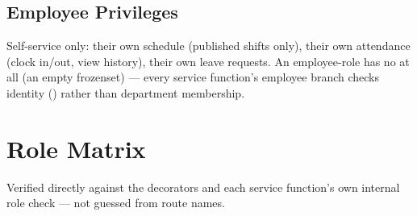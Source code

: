 \subsection*{Employee Privileges}

Self-service only: their own schedule (published shifts only), their
own attendance (clock in/out, view history), their own leave requests.
An employee-role  has no  at
all (an empty frozenset) --- every service function's employee branch
checks identity () rather than
department membership.

\section{Role Matrix}

Verified directly against the  decorators and
each service function's own internal role check --- not guessed from
route names.


